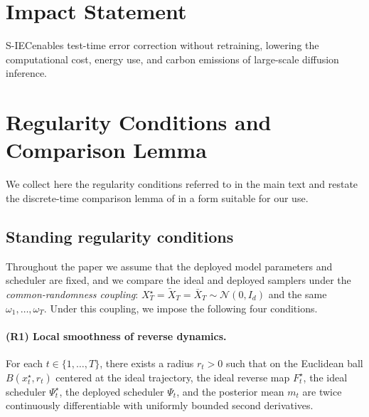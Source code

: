 \documentclass{article}
\theoremstyle{plain}
\theoremstyle{definition}
\theoremstyle{remark}
\newcommand{\SIEC}{\texorpdfstring{S\mbox{-}IEC\xspace}{S-IEC }}
\begin{document}
\section*{Impact Statement}

\SIEC enables test-time error correction without retraining, lowering the
computational cost, energy use, and carbon emissions of large-scale
diffusion inference.




\clearpage
\appendix


\section{Regularity Conditions and Comparison Lemma}
\label{app:reg}

We collect here the regularity conditions referred to in the main text and
restate the discrete-time comparison lemma of
\citet{reeves2025itproofs} in a form suitable for our use.

\subsection{Standing regularity conditions}
\label{app:regconds}

Throughout the paper we assume that the deployed model parameters and
scheduler are fixed, and we compare the ideal and deployed samplers under
the \emph{common-randomness coupling}: \(X_T^\star = \tilde X_T = \bar X_T
\sim \mathcal{N}(0,I_d)\) and the same \(\omega_1,\dots,\omega_T\). Under
this coupling, we impose the following four conditions.

\paragraph{(R1) Local smoothness of reverse dynamics.}
For each \(t\in\{1,\dots,T\}\), there exists a radius \(r_t>0\) such that on
the Euclidean ball \(B(x_t^\star, r_t)\) centered at the ideal trajectory,
the ideal reverse map \(F_t^\star\), the ideal scheduler \(\Psi_t^\star\),
the deployed scheduler \(\Psi_t\), and the posterior mean \(m_t\) are
twice continuously differentiable with uniformly bounded second derivatives.
\end{document}
